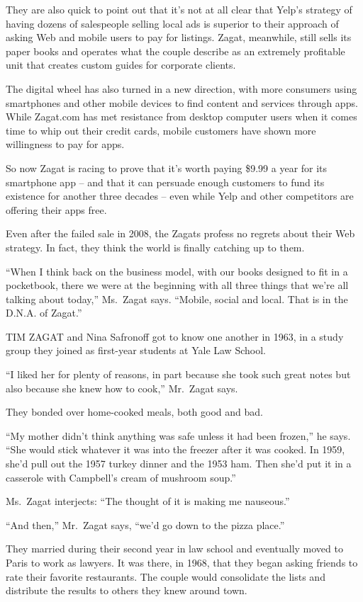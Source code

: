 ﻿\documentclass[12pt]{article}
\begin{document}
They are also quick to point out that it's not at all clear that Yelp's strategy of having dozens of
salespeople selling local ads is superior to their approach of asking Web and mobile users to pay
for listings. Zagat, meanwhile, still sells its paper books and operates what the couple describe as
an extremely profitable unit that creates custom guides for corporate clients.

The digital wheel has also turned in a new direction, with more consumers using smartphones and
other mobile devices to find content and services through apps. While Zagat.com has met resistance
from desktop computer users when it comes time to whip out their credit cards, mobile customers have
shown more willingness to pay for apps.

So now Zagat is racing to prove that it's worth paying \$9.99 a year for its smartphone app -- and
that it can persuade enough customers to fund its existence for another three decades -- even while
Yelp and other competitors are offering their apps free.

Even after the failed sale in 2008, the Zagats profess no regrets about their Web strategy. In fact,
they think the world is finally catching up to them.

``When I think back on the business model, with our books designed to fit in a pocketbook, there we
were at the beginning with all three things that we're all talking about today,'' Ms.~Zagat says.
``Mobile, social and local. That is in the D.N.A. of Zagat.''

TIM ZAGAT and Nina Safronoff got to know one another in 1963, in a study group they joined as
first-year students at Yale Law School.

``I liked her for plenty of reasons, in part because she took such great notes but also because she
knew how to cook,'' Mr.~Zagat says.

They bonded over home-cooked meals, both good and bad.

``My mother didn't think anything was safe unless it had been frozen,'' he says. ``She would stick
whatever it was into the freezer after it was cooked. In 1959, she'd pull out the 1957 turkey dinner
and the 1953 ham. Then she'd put it in a casserole with Campbell's cream of mushroom soup.''

Ms.~Zagat interjects: ``The thought of it is making me nauseous.''

``And then,'' Mr.~Zagat says, ``we'd go down to the pizza place.''

They married during their second year in law school and eventually moved to Paris to work as
lawyers. It was there, in 1968, that they began asking friends to rate their favorite restaurants.
The couple would consolidate the lists and distribute the results to others they knew around town.
\end{document}
